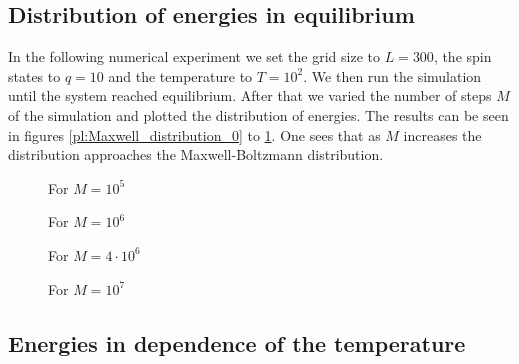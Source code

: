 \subsection{Distribution of energies in equilibrium}

In the following numerical experiment we set the grid size to $L=300$, the spin states to $q=10$ and the temperature to $T=10^2$. We then run the simulation until the system reached equilibrium. After that we varied the number of steps $M$ of the simulation and plotted the distribution of energies. The results can be seen in figures \ref{pl:Maxwell_distribution_0} to \ref{pl:Maxwell_distribution_3}. One sees that as $M$ increases the distribution approaches the Maxwell-Boltzmann distribution.

\begin{figure}
\begin{minipage}[b]{0.4\textwidth}
\centering

\vspace*{-0.5cm}
\caption{For $M=10^5$}
\label{pl:Maxwell_distribution_0}
\end{minipage}
\hfill
\begin{minipage}[b]{0.4\textwidth}
\centering

\vspace*{-0.5cm}
\caption{For $M=10^6$}
\label{pl:Maxwell_distribution_1}
\end{minipage}
\begin{minipage}[b]{0.4\textwidth}
\vspace*{1cm}
\centering

\vspace*{-0.5cm}
\caption{For $M=4\cdot10^6$}
\label{pl:Maxwell_distribution_2}
\end{minipage}
\hfill
\begin{minipage}[b]{0.4\textwidth}
\centering

\vspace*{-0.5cm}
\caption{For $M=10^7$}
\label{pl:Maxwell_distribution_3}
\end{minipage}
\end{figure}

\subsection*{Energies in dependence of the temperature}


